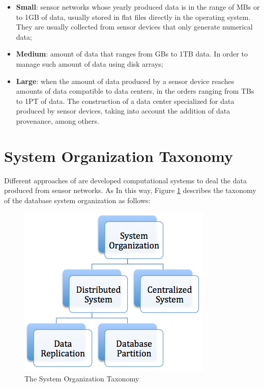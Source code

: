 \begin{itemize}
  \item \textbf{Small}: sensor networks whose yearly produced data is in the
  range of MBs or to 1GB of data, usually stored in flat files directly in the
  operating system. They are usually collected from sensor devices that only
  generate numerical data;
  \item \textbf{Medium}: amount of data that ranges from GBs to 1TB data. In
  order to manage such amount of data using disk arrays;
  \item \textbf{Large}: when the amount of data produced by a sensor device
  reaches amounts of data compatible to data centers, in the orders ranging
  from TBs to 1PT of data. The construction of a data center specialized for
  data produced by sensor devices, taking into account the addition of data
  provenance, among others.
\end{itemize}

\section{System Organization Taxonomy} 

Different approaches of are developed computational systems to deal the data
produced from sensor networks. As  
In this way, Figure \ref{fig:taxonomy-database-architecture} describes the
taxonomy of the database system organization as follows:

\begin{figure}[h]
  \centering
  \includegraphics[scale=0.5]{../diagrams/taxonomy-database-architecture}
  \caption{The System Organization Taxonomy}
  \label{fig:taxonomy-database-architecture}
\end{figure}

